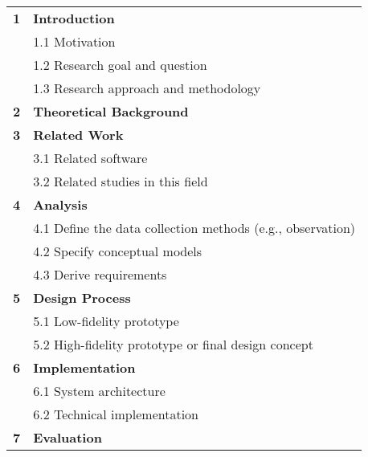 \begin{table}[h]
\small
\colorbox{usethiscolorhere}{
\centering
\begin{tabularx}{\textwidth}{@{} r Y @{}}
	\textbf{1}
	& \textbf{Introduction}\vspace{2mm}\\
	& 1.1 Motivation \vspace{2mm}\\
    & 1.2 Research goal and question\vspace{2mm}\\
    & 1.3 Research approach and methodology\vspace{2mm}\\
	\textbf{2}
	& \textbf{Theoretical Background}\vspace{2mm}\\
	\textbf{3}
	& \textbf{Related Work}\vspace{2mm}\\
    & 3.1 Related software\vspace{2mm}\\
    & 3.2 Related studies in this field\vspace{2mm}\\
	\textbf{4}
	& \textbf{Analysis}\vspace{2mm}\\
    & 4.1 Define the data collection methods (e.g., observation)\vspace{2mm}\\
    & 4.2 Specify conceptual models\vspace{2mm}\\
    & 4.3 Derive requirements\vspace{2mm}\\
	\textbf{5}
	& \textbf{Design Process}\vspace{2mm}\\
    & 5.1 Low-fidelity prototype\vspace{2mm}\\
    & 5.2 High-fidelity prototype or final design concept\vspace{2mm}\\
	\textbf{6}
	& \textbf{Implementation}\vspace{2mm}\\
    & 6.1 System architecture\vspace{2mm}\\
    & 6.2 Technical implementation\vspace{2mm}\\
	\textbf{7}
	& \textbf{Evaluation}\vspace{2mm}\\

\end{tabularx}}
\end{table}
